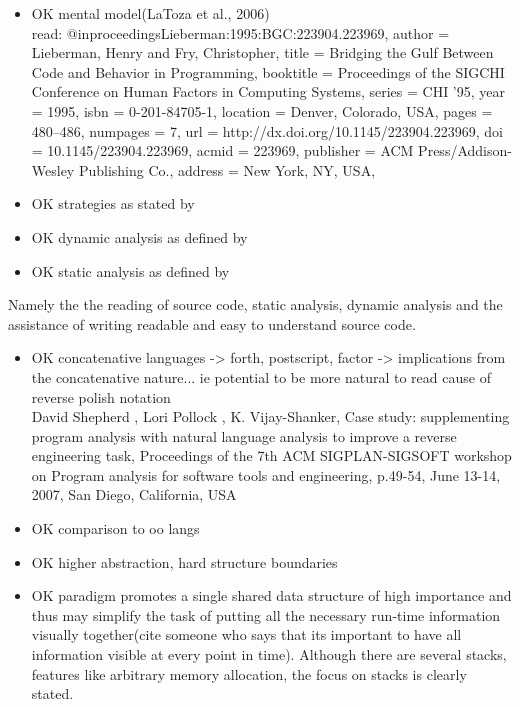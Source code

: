 \begin{itemize}
\item OK mental model(LaToza et al., 2006)\\ read: 
@inproceedings{Lieberman:1995:BGC:223904.223969,
author = {Lieberman, Henry and Fry, Christopher},
title = {Bridging the Gulf Between Code and Behavior in Programming},
booktitle = {Proceedings of the SIGCHI Conference on Human Factors in Computing Systems},
series = {CHI '95},
year = {1995},
isbn = {0-201-84705-1},
location = {Denver, Colorado, USA},
pages = {480--486},
numpages = {7},
url = {http://dx.doi.org/10.1145/223904.223969},
doi = {10.1145/223904.223969},
acmid = {223969},
publisher = {ACM Press/Addison-Wesley Publishing Co.},
address = {New York, NY, USA},
}

\item OK strategies as stated by \cite{Storey:1999:CDE:308936.308940}

\item OK dynamic analysis as defined by \cite{Ball:1999:CDA:318774.318944} \cite{Cornelissen:2009:SSP:1638616.1639301}

\item OK static analysis as defined by \cite{Ball:1999:CDA:318774.318944}
\end{itemize}

Namely the the reading of source code, static analysis, dynamic analysis and the assistance of writing readable and easy to understand source code.

\begin{itemize}
\item OK concatenative languages -> forth, postscript, factor -> implications from the concatenative nature... ie potential to be more natural to read cause of reverse polish notation \\
	David Shepherd , Lori Pollock , K. Vijay-Shanker, Case study: supplementing program analysis with natural language analysis to improve a reverse engineering task, Proceedings of the 7th ACM SIGPLAN-SIGSOFT workshop on Program analysis for software tools and engineering, p.49-54, June 13-14, 2007, San Diego, California, USA
\item OK comparison to oo langs
\item OK higher abstraction, hard structure boundaries
\item OK paradigm promotes a single shared data structure of high importance and thus may simplify the task of putting all the necessary run-time information visually together(cite someone who says that its important to have all information visible at every point in time). Although there are several stacks, features like arbitrary memory allocation, the focus on stacks is clearly stated.
\end{itemize}

